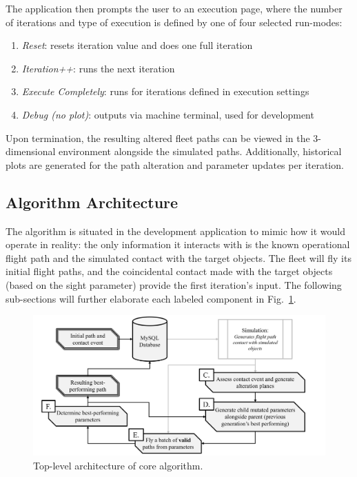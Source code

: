\documentclass[conf]{new-aiaa}
\begin{document}
The application then prompts the user to an execution page, where the number of iterations and type of execution is defined by one of four selected run-modes:
\begin{enumerate}
\item \emph{Reset}: resets iteration value and does one full iteration
\item \emph{Iteration++}: runs the next iteration
\item \emph{Execute Completely}: runs for iterations defined in execution settings
\item \emph{Debug (no plot)}: outputs via machine terminal, used for development
\end{enumerate}

Upon termination, the resulting altered fleet paths can be viewed in the 3-dimensional environment alongside the simulated paths. Additionally, historical plots are generated for the path alteration and parameter updates per iteration.


\subsection{Algorithm Architecture}
The algorithm is situated in the development application to mimic how it would operate in reality: the only information it interacts with is the known operational flight path and the simulated contact with the target objects. The fleet will fly its initial flight paths, and the coincidental contact made with the target objects (based on the sight parameter) provide the first iteration's input. The following sub-sections will further elaborate each labeled component in Fig.~\ref{algo-architecture}.

\begin{figure}[hbt!]
\centering
\includegraphics[width=1\textwidth]{figs/algo-architecture}
\caption{Top-level architecture of core algorithm.}
\label{algo-architecture}
\end{figure}
\end{document}
